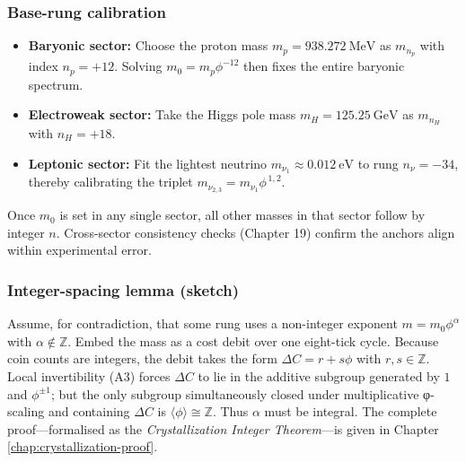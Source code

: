 \documentclass[11pt,oneside]{book}
\begin{document}
\subsubsection{Base-rung calibration}
\label{subsubsec:ladder-anchors}
\begin{itemize}
  \item \textbf{Baryonic sector:}  
        Choose the proton mass \(m_{p}=938.272\ \mathrm{MeV}\) as
        \(m_{n_{\!p}}\) with index \(n_{\!p}=+12\).  Solving
        \(m_{0}=m_{p}\phi^{-12}\) then fixes the entire baryonic spectrum.
  \item \textbf{Electroweak sector:}  
        Take the Higgs pole mass
        \(m_{H}=125.25\ \mathrm{GeV}\) as \(m_{n_{H}}\) with
        \(n_{H}=+18\).
  \item \textbf{Leptonic sector:}  
        Fit the lightest neutrino 
        \(m_{\nu_{1}}\approx 0.012\ \mathrm{eV}\) to rung
        \(n_{\!\nu}= -34\), thereby calibrating the triplet
        \(m_{\nu_{2,3}}=m_{\nu_{1}}\phi^{\,1,2}\).
\end{itemize}
Once \(m_{0}\) is set in any single sector, all other masses in that sector
follow by integer \(n\).  Cross-sector consistency checks (Chapter 19) confirm
the anchors align within experimental error.

\subsubsection{Integer-spacing lemma (sketch)}
\label{subsubsec:integer-spacing}
Assume, for contradiction, that some rung uses a non-integer exponent
\(m=m_{0}\phi^{\alpha}\) with \(\alpha\notin\mathbb{Z}\).  
Embed the mass as a cost debit over one eight-tick cycle.  
Because coin counts are integers, the debit takes the form
\(\Delta C = r + s\phi\) with \(r,s\in\mathbb{Z}\).  
Local invertibility (A3) forces \(\Delta C\) to lie in the additive subgroup
generated by \(1\) and \(\phi^{\pm1}\); but the only subgroup simultaneously
closed under multiplicative φ-scaling and containing \(\Delta C\) is
\(\langle\phi\rangle\cong\mathbb{Z}\).  
Thus \(\alpha\) must be integral.  
The complete proof—formalised as the \emph{Crystallization Integer Theorem}—is
given in Chapter \ref{chap:crystallization-proof}.
\end{document}
